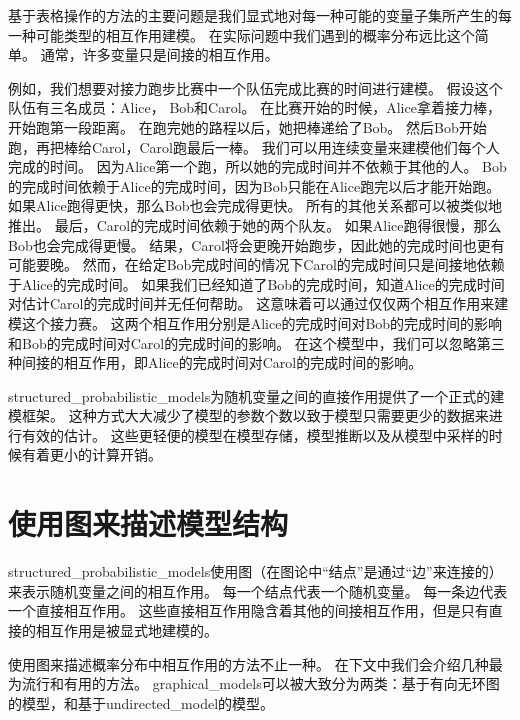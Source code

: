 基于表格操作的方法的主要问题是我们显式地对每一种可能的变量子集所产生的每一种可能类型的相互作用建模。
在实际问题中我们遇到的概率分布远比这个简单。
通常，许多变量只是间接的相互作用。


例如，我们想要对接力跑步比赛中一个队伍完成比赛的时间进行建模。
假设这个队伍有三名成员：Alice， Bob和Carol。
在比赛开始的时候，Alice拿着接力棒，开始跑第一段距离。
在跑完她的路程以后，她把棒递给了Bob。
然后Bob开始跑，再把棒给Carol，Carol跑最后一棒。
我们可以用连续变量来建模他们每个人完成的时间。
因为Alice第一个跑，所以她的完成时间并不依赖于其他的人。
Bob的完成时间依赖于Alice的完成时间，因为Bob只能在Alice跑完以后才能开始跑。
如果Alice跑得更快，那么Bob也会完成得更快。
所有的其他关系都可以被类似地推出。
最后，Carol的完成时间依赖于她的两个队友。
如果Alice跑得很慢，那么Bob也会完成得更慢。
结果，Carol将会更晚开始跑步，因此她的完成时间也更有可能要晚。
然而，在给定Bob完成时间的情况下Carol的完成时间只是间接地依赖于Alice的完成时间。
如果我们已经知道了Bob的完成时间，知道Alice的完成时间对估计Carol的完成时间并无任何帮助。
这意味着可以通过仅仅两个相互作用来建模这个接力赛。
这两个相互作用分别是Alice的完成时间对Bob的完成时间的影响和Bob的完成时间对Carol的完成时间的影响。
在这个模型中，我们可以忽略第三种间接的相互作用，即Alice的完成时间对Carol的完成时间的影响。


\gls{structured_probabilistic_models}为随机变量之间的直接作用提供了一个正式的建模框架。
这种方式大大减少了模型的参数个数以致于模型只需要更少的数据来进行有效的估计。
这些更轻便的模型在模型存储，模型推断以及从模型中采样的时候有着更小的计算开销。


\section{使用图来描述模型结构}
\label{sec:using_graphs_to_describe_model_structure}


\gls{structured_probabilistic_models}使用图（在图论中``结点''是通过``边''来连接的）来表示随机变量之间的相互作用。
每一个结点代表一个随机变量。
每一条边代表一个直接相互作用。
这些直接相互作用隐含着其他的间接相互作用，但是只有直接的相互作用是被显式地建模的。


使用图来描述概率分布中相互作用的方法不止一种。
在下文中我们会介绍几种最为流行和有用的方法。
\gls{graphical_models}可以被大致分为两类：基于有向无环图的模型，和基于\gls{undirected_model}的模型。


\subsection{}
\label{sec:directed_models}


